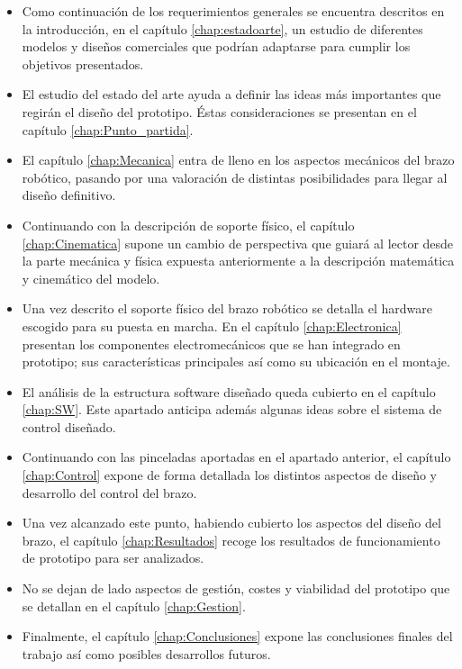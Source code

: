 \begin{itemize}
    \item Como continuación de los requerimientos generales se encuentra descritos en la introducción, en el capítulo \ref{chap:estadoarte}, un estudio de diferentes modelos y diseños comerciales que podrían adaptarse para cumplir los objetivos presentados.
    \item El estudio del estado del arte ayuda a definir las ideas más importantes que regirán el diseño del prototipo. Éstas consideraciones se presentan en el capítulo \ref{chap:Punto_partida}.
    \item El capítulo \ref{chap:Mecanica} entra de lleno en los aspectos mecánicos del brazo robótico, pasando por una valoración de distintas posibilidades para llegar al diseño definitivo.
    \item Continuando con la descripción de soporte físico, el capítulo \ref{chap:Cinematica} supone un cambio de perspectiva que guiará al lector desde la parte mecánica y física expuesta anteriormente a la descripción matemática y cinemático del modelo.
    \item Una vez descrito el soporte físico del brazo robótico se detalla el hardware escogido para su puesta en marcha. En el capítulo \ref{chap:Electronica} presentan los componentes electromecánicos que se han integrado en prototipo; sus características principales así como su ubicación en el montaje.
    \item El análisis de la estructura software diseñado queda cubierto en el capítulo \ref{chap:SW}. Este apartado anticipa además algunas ideas sobre el sistema de control diseñado.
    \item Continuando con las pinceladas aportadas en el apartado anterior, el capítulo \ref{chap:Control} expone de forma detallada los distintos aspectos de diseño y desarrollo del control del brazo.
    \item Una vez alcanzado este punto, habiendo cubierto los aspectos del diseño del brazo, el capítulo \ref{chap:Resultados} recoge los resultados de funcionamiento de prototipo para ser analizados.
    \item No se dejan de lado aspectos de gestión, costes y viabilidad del prototipo que se detallan en el capítulo \ref{chap:Gestion}.
    \item Finalmente, el capítulo \ref{chap:Conclusiones} expone las conclusiones finales del trabajo así como posibles desarrollos futuros.
\end{itemize}

